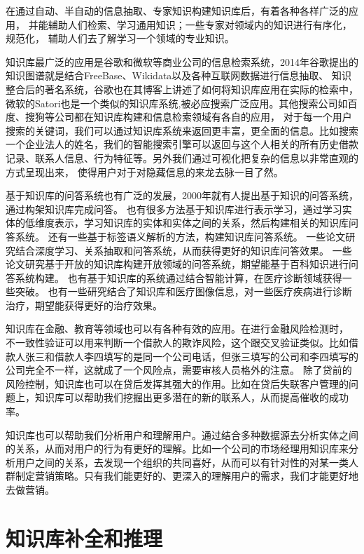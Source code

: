在通过自动、半自动的信息抽取、专家知识构建知识库后，有着各种各样广泛的应用，
并能辅助人们检索、学习通用知识；一些专家对领域内的知识进行有序化，规范化，
辅助人们去了解学习一个领域的专业知识。

知识库最广泛的应用是谷歌和微软等商业公司的信息检索系统，2014年谷歌提出的知识图谱\cite{Dong2014KnowledgeVA}就是结合FreeBase、Wikidata以及各种互联网数据进行信息抽取、
知识整合后的著名系统，谷歌也在其博客上讲述了如何将知识库应用在实际的检索中，
微软的Satori也是一个类似的知识库系统,被必应搜索广泛应用。其他搜索公司如百度、搜狗等公司都在知识库构建和信息检索领域有各自的应用，
对于每一个用户搜索的关键词，我们可以通过知识库系统来返回更丰富，更全面的信息。比如搜索一个企业法人的姓名，我们的智能搜索引擎可以返回与这个人相关的所有历史借款记录、联系人信息、行为特征等。另外我们通过可视化把复杂的信息以非常直观的方式呈现出来， 使得用户对于对隐藏信息的来龙去脉一目了然。

基于知识库的问答系统也有广泛的发展，2000年就有人提出基于知识的问答系统\cite{HERMJAKOB2000KnowledgeBasedQA}，通过构架知识库完成问答。
也有很多方法基于知识库进行表示学习\cite{Yang2014JointRE}，通过学习实体的低维度表示，学习知识库的实体和实体之间的关系，然后构建相关的知识库问答系统。
还有一些基于标签语义解析的方法，构建知识库问答系统\cite{Yih2016TheVO}。
一些论文\cite{Yu2017ImprovedNR}研究结合深度学习、关系抽取和问答系统，从而获得更好的知识库问答效果。
一些论文\cite{KeySun2016OpenKB}研究基于开放的知识库构建开放领域的问答系统，期望能基于百科知识进行问答系统构建。
也有基于知识库的系统通过结合智能计算\cite{Pandey2009KnowledgeAI}，在医疗诊断领域获得一些突破。
也有一些研究结合了知识库和医疗图像信息\cite{Halpern2014EvaluationOC}，对一些医疗疾病进行诊断治疗，期望能获得更好的治疗效果。

知识库在金融、教育等领域也可以有各种有效的应用。在进行金融风险检测时，
不一致性验证可以用来判断一个借款人的欺诈风险，这个跟交叉验证类似。比如借款人张三和借款人李四填写的是同一个公司电话，但张三填写的公司和李四填写的公司完全不一样，这就成了一个风险点，需要审核人员格外的注意。
除了贷前的风险控制，知识库也可以在贷后发挥其强大的作用。比如在贷后失联客户管理的问题上，知识库可以帮助我们挖掘出更多潜在的新的联系人，从而提高催收的成功率。

知识库也可以帮助我们分析用户和理解用户。通过结合多种数据源去分析实体之间的关系，从而对用户的行为有更好的理解。比如一个公司的市场经理用知识库来分析用户之间的关系，去发现一个组织的共同喜好，从而可以有针对性的对某一类人群制定营销策略。只有我们能更好的、更深入的理解用户的需求，我们才能更好地去做营销。

\section{知识库补全和推理}

